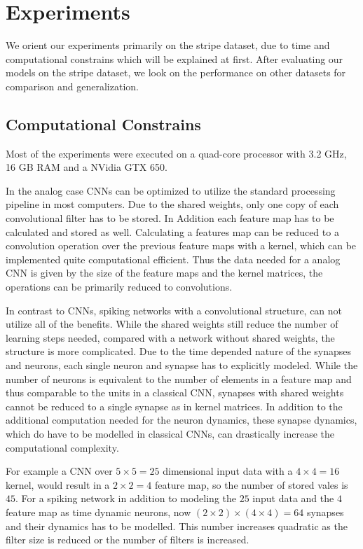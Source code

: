 \section{Experiments}

We orient our experiments primarily on the stripe dataset, due to time and computational constrains which will be explained at first.
After evaluating our models on the stripe dataset, we look on the performance on other datasets for comparison and generalization.     

\subsection{Computational Constrains}

Most of the experiments were executed on a quad-core processor with 3.2 GHz, 16 GB RAM and a NVidia GTX 650.

In the analog case CNNs can be optimized to utilize the standard processing pipeline in most computers. 
Due to the shared weights, only one copy of each convolutional filter has to be stored. 
In Addition each feature map has to be calculated and stored as well.
Calculating a features map can be reduced to a convolution operation over the previous feature maps with a kernel, which can be implemented quite computational efficient.
Thus the data needed for a analog CNN is given by the size of the feature maps and the kernel matrices, the operations can be primarily reduced to convolutions.  

In contrast to CNNs, spiking networks with a convolutional structure, can not utilize all of the benefits.
While the shared weights still reduce the number of learning steps needed, compared with a network without shared weights, the structure is more complicated.
Due to the time depended nature of the synapses and neurons, each single neuron and synapse has to explicitly modeled.
While the number of neurons is equivalent to the number of elements in a feature map and thus comparable to the units in a classical CNN, synapses with shared weights cannot be reduced to a single synapse as in kernel matrices.
In addition to the additional computation needed for the neuron dynamics, these synapse dynamics, which do have to be modelled in classical CNNs, can drastically increase the computational complexity.   

For example a CNN over $5 \times 5 = 25$ dimensional input data with a $4 \times 4 = 16$ kernel, would result in a $2 \times 2 = 4$ feature map, so the number of stored vales is $45$. 
For a spiking network in addition to modeling the $25$ input data and the $4$ feature map as time dynamic neurons, now $(2 \times 2) \times (4 \times 4) = 64$ synapses and their dynamics has to be modelled.
This number increases quadratic as the filter size is reduced or the number of filters is increased.


